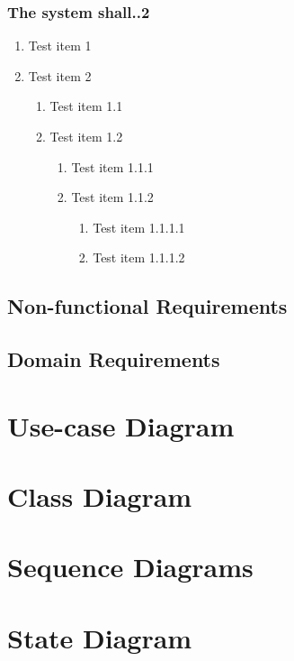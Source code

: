 \documentclass[12pt]{article}
\newenvironment{requirement}[1]
{
    \renewcommand{\thesubsubsection}{R\arabic{subsubsection}.}
    \renewcommand{\labelenumi}{
        \arabic{subsubsection}.\arabic{enumi}
    }
    \renewcommand{\labelenumii}{
        \arabic{subsubsection}.\arabic{enumi}.\arabic{enumii}
    }
    \renewcommand{\labelenumiii}{
        \arabic{subsubsection}.\arabic{enumi}.\arabic{enumii}.\arabic{enumiii}
    }
    \renewcommand{\labelenumiv}{
        \arabic{subsubsection}.\arabic{enumi}.\arabic{enumii}.\arabic{enumiii}.\arabic{enumiv}
    }
    \subsubsection{#1}
}
{}
\begin{document}
\begin{requirement}{The system shall..2}


\begin{enumerate}
    \item Test item 1
    \item Test item 2
    \begin{enumerate}
        \item Test item 1.1
        \item Test item 1.2
        \begin{enumerate}
            \item Test item 1.1.1
            \item Test item 1.1.2
            \begin{enumerate}
                \item Test item 1.1.1.1
                \item Test item 1.1.1.2
            \end{enumerate}
        \end{enumerate}
    \end{enumerate}
\end{enumerate}


\end{requirement}

\subsection{Non-functional Requirements}

\subsection{Domain Requirements}

\section{Use-case Diagram}

\section{Class Diagram}

\section{Sequence Diagrams}

\section{State Diagram}
\end{document}
